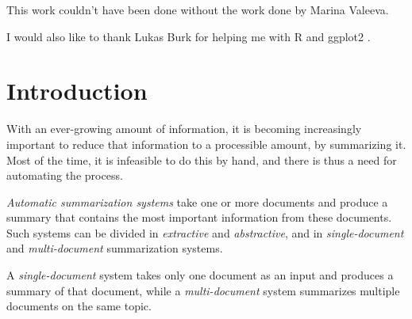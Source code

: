 \documentclass[a4paper,10pt]{scrartcl}
\theoremstyle{style}
\begin{document}
This work couldn't have been done without the work done by Marina Valeeva.

I would also like to thank Lukas Burk for helping me with R \citep{R} and ggplot2 \citep{ggplot2}.
\newpage

\thispagestyle{empty}
\tableofcontents
\newpage

\setcounter{page}{1}		%
\newpage







\maketableofcontents

\section{Introduction}

With an ever-growing amount of information, it is becoming increasingly important to reduce that information to a processible amount, by summarizing it. Most of the time, it is infeasible to do this by hand, and there is thus a need for automating the process.

\textit{Automatic summarization systems} take one or more documents and produce a summary that contains the most important information from these documents. Such systems can be divided in \textit{extractive} and \textit{abstractive}, and in \textit{single-document} and \textit{multi-document} summarization systems.

A \textit{single-document} system takes only one document as an input and produces a summary of that document, while a \textit{multi-document} system summarizes multiple documents on the same topic.
\end{document}
